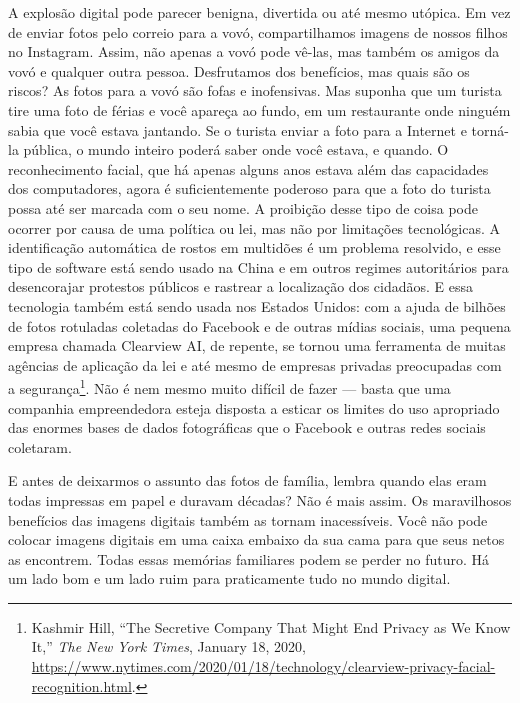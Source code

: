 A explosão digital pode parecer benigna, divertida ou até mesmo utópica. Em vez 
de enviar fotos pelo correio para a vovó, compartilhamos imagens de nossos 
filhos no Instagram. Assim, não apenas a vovó pode vê-las, mas também os amigos 
da vovó e qualquer outra pessoa. Desfrutamos dos benefícios, mas quais são os 
riscos? As fotos para a vovó são fofas e inofensivas. Mas suponha que um turista
tire uma foto de férias e você apareça ao fundo, em um restaurante onde ninguém
sabia que você estava jantando. Se o turista enviar a foto para a Internet e
torná-la pública, o mundo inteiro poderá saber onde você estava, e quando. O
reconhecimento facial, que há apenas alguns anos
estava além das capacidades dos 
computadores, agora é suficientemente poderoso para que a foto do turista possa
até ser marcada com o seu nome. A proibição desse tipo de coisa pode ocorrer por
causa de uma política ou lei, mas não por limitações tecnológicas. A
identificação automática de rostos em multidões é um problema resolvido, e esse
tipo de software está sendo usado na China e em outros regimes autoritários para
desencorajar protestos públicos e rastrear a localização dos cidadãos.%
 E essa
tecnologia também está sendo usada nos Estados Unidos: com a ajuda de bilhões de
fotos rotuladas coletadas do Facebook e de outras mídias sociais, uma pequena
empresa chamada Clearview AI, de repente, se tornou uma
ferramenta de muitas 
agências de aplicação da lei e até mesmo de empresas privadas preocupadas
com a segurança\footnote{Kashmir Hill, ``The Secretive Company That Might End
Privacy as We Know It,'' \textit{The New York Times}, January 18, 2020,
\url{https://www.nytimes.com/2020/01/18/technology/clearview-privacy-facial-recognition.html}.}.
Não é nem mesmo muito difícil de fazer --- basta que uma companhia
empreendedora esteja disposta a esticar os limites do uso apropriado das enormes
bases de dados fotográficas que o Facebook e outras redes sociais
coletaram.%

E antes de deixarmos o assunto das fotos de família, lembra quando elas eram 
todas impressas em papel e duravam décadas? Não é mais assim. Os maravilhosos 
benefícios das imagens digitais também as tornam inacessíveis. Você não pode 
colocar imagens digitais em uma caixa embaixo da sua cama para que seus netos as
encontrem. Todas essas memórias familiares podem se perder no futuro. Há um lado
bom e um lado ruim para praticamente tudo no mundo digital.


